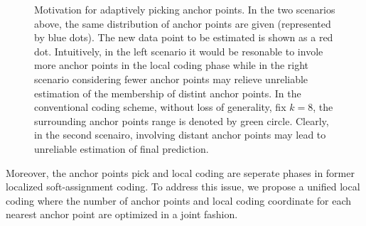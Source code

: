 \documentclass{llncs}
\begin{document}
	\begin{figure}[!tbp]
		\centering
		\hfill
		\caption{Motivation for adaptively picking anchor points. In the two scenarios above, the same distribution of anchor points are given (represented by blue dots). The new data point to be estimated is shown as a red dot. Intuitively, in the left scenario it would be resonable to invole more anchor points in the local coding phase while in the right scenario considering fewer anchor points may relieve unreliable estimation of the membership of distint anchor points. In the conventional coding scheme, without loss of generality, fix $k = 8$, the surrounding anchor points range is denoted by green circle. Clearly, in the second scenairo, involving distant anchor points may lead to unreliable estimation of final prediction.}
	\end{figure}
	 Moreover, the anchor points pick and local coding are seperate phases in former localized soft-assignment coding. To address this issue, we propose a unified local coding  where the number of anchor points and local coding coordinate for each nearest anchor point are optimized in a joint fashion.
	
\end{document}
